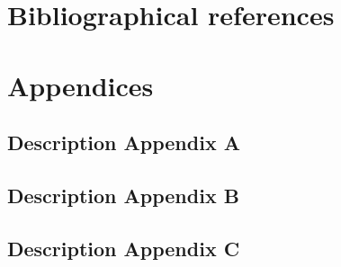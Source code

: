 \documentclass[12pt,a4paper]{article}
\begin{document}
  \newpage
  \section*{Bibliographical references}
  

  \newpage
  \section{Appendices}
    \newpage
    \subsection{Description Appendix A}
    \newpage
    \subsection{Description Appendix B}
    \newpage
    \subsection{Description Appendix C}
\end{document}
